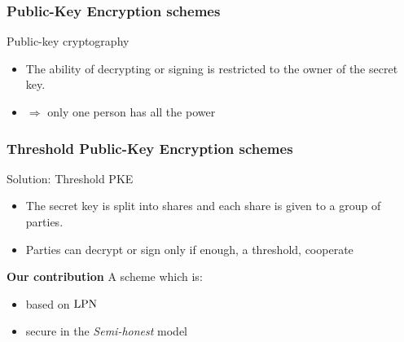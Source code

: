 \begin{frame}
\frametitle{Public-Key Encryption schemes}

\begin{center}\end{center}

\begin{block}{Public-key cryptography}  
  \begin{itemize}
   \item<2-> The ability of decrypting or signing is restricted to the owner of the secret key.
   \item<3-> $\Rightarrow$ \alert{only one person has all the power} 
  \end{itemize}  
 \end{block}
 \end{frame}
 

 \begin{frame}
 \frametitle{Threshold Public-Key Encryption schemes}

 \begin{overprint}
 \begin{center}  \end{center}
  \begin{center}  \end{center}
  \begin{center}  \end{center}
 \end{overprint}

 \begin{overprint}
  
 \begin{block}{Solution: Threshold PKE}
 \begin{itemize}
  \item<2-> The secret key is split into shares and each share is given to a group of parties.
  \item<3-> Parties can decrypt or sign only if enough, a \alert{threshold}, cooperate
  \end{itemize}  
 \end{block}
 
 \begin{block}{\textbf{Our contribution}}
 A {\color{red}{Threshold Public-Key Encryption}} scheme which is:
 \begin{itemize}
   \item<5-> based on $\mathrm{LPN}$
   \item<6-> secure in the \emph{Semi-honest} model
  \end{itemize}
 \end{block}
 
 \end{overprint}

\end{frame}


